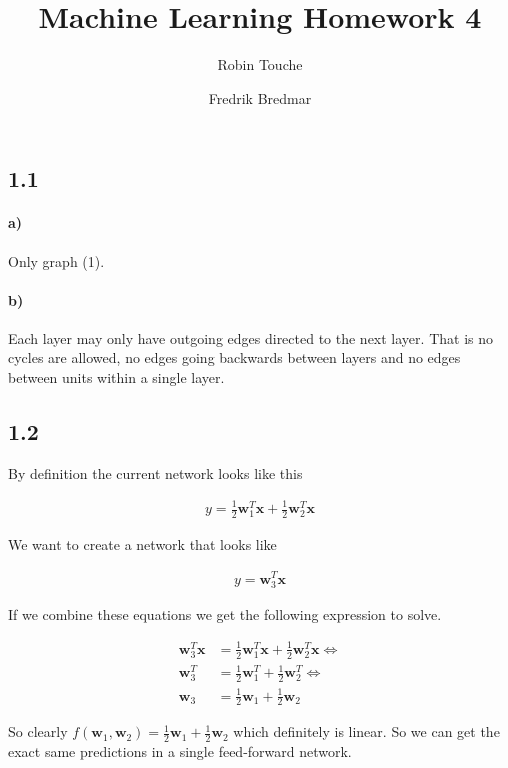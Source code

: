 \documentclass{article}
\author{
  Robin Touche \\
  \and
  Fredrik Bredmar
}
\title{Machine Learning Homework 4}
\begin{document}
\maketitle

\subsection*{1.1}
\paragraph{a)}

Only graph (1).

\paragraph{b)}

Each layer may only have outgoing edges directed to the next layer.
That is no cycles are allowed, no edges going backwards between layers and
no edges between units within a single layer.

\subsection*{1.2}

By definition the current network looks like this

\begin{align}
  y = \frac{1}{2}\mathbf{w}_1^T \mathbf{x} + \frac{1}{2}\mathbf{w}_2^T \mathbf{x}
\end{align}

We want to create a network that looks like

\begin{align}
  y = \mathbf{w}_3^T \mathbf{x}
\end{align}

If we combine these equations we get the following expression to solve.

\begin{align}
  \nonumber \mathbf{w}_3^T \mathbf{x} &= \frac{1}{2}\mathbf{w}_1^T \mathbf{x} + \frac{1}{2}\mathbf{w}_2^T \mathbf{x} \Leftrightarrow\\
  \mathbf{w}_3^T &= \frac{1}{2}\mathbf{w}_1^T + \frac{1}{2}\mathbf{w}_2^T \Leftrightarrow\\
  \nonumber \mathbf{w}_3 &= \frac{1}{2}\mathbf{w}_1 + \frac{1}{2}\mathbf{w}_2
\end{align}

So clearly $f(\mathbf{w}_1,\mathbf{w}_2) = \frac{1}{2} \mathbf{w}_1 + \frac{1}{2}\mathbf{w}_2$ which definitely is linear.
So we can get the exact same predictions in a single feed-forward network.
\end{document}
